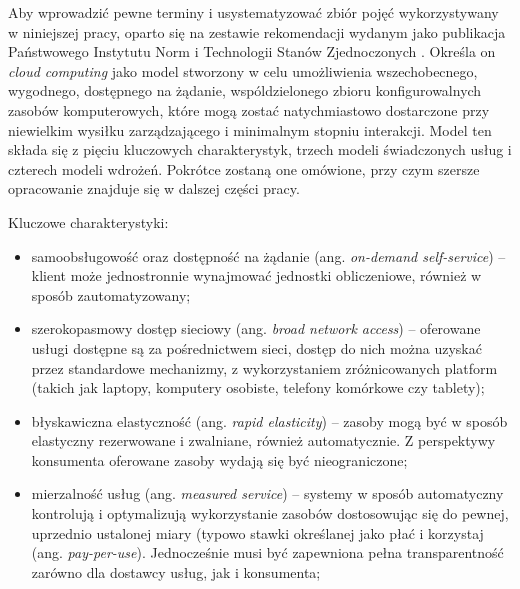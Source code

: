\documentclass[12pt,a4paper,twoside]{article}
\begin{document}
Aby wprowadzić pewne terminy i usystematyzować zbiór pojęć wykorzystywany w niniejszej pracy, oparto się na zestawie rekomendacji wydanym jako publikacja Państwowego Instytutu Norm i Technologii Stanów Zjednoczonych \citep{mell2011}. Określa on \textit{cloud computing} jako model stworzony w celu umożliwienia wszechobecnego, wygodnego, dostępnego na żądanie, wspóldzielonego zbioru konfigurowalnych zasobów komputerowych, które mogą zostać natychmiastowo dostarczone przy niewielkim wysiłku zarządzającego i minimalnym stopniu interakcji. Model ten składa się z pięciu kluczowych charakterystyk, trzech modeli świadczonych usług i czterech modeli wdrożeń. Pokrótce zostaną one omówione, przy czym szersze opracowanie znajduje się w dalszej części pracy.

\noindent
Kluczowe charakterystyki:
\begin{itemize}
\item samoobsługowość oraz dostępność na żądanie (ang. \textit{on-demand self-service}) -- klient może jednostronnie wynajmować jednostki obliczeniowe, również w sposób zautomatyzowany;
\item szerokopasmowy dostęp sieciowy (ang. \textit{broad network access}) -- oferowane usługi dostępne są za pośrednictwem sieci, dostęp do nich można uzyskać przez standardowe mechanizmy, z wykorzystaniem zróżnicowanych platform (takich jak laptopy, komputery osobiste, telefony komórkowe czy tablety);
\item błyskawiczna elastyczność (ang. \textit{rapid elasticity}) -- zasoby mogą być w sposób elastyczny rezerwowane i zwalniane, również automatycznie. Z perspektywy konsumenta oferowane zasoby wydają się być nieograniczone;
\item mierzalność usług (ang. \textit{measured service}) -- systemy w sposób automatyczny kontrolują i optymalizują wykorzystanie zasobów dostosowując się do pewnej, uprzednio ustalonej miary (typowo stawki określanej jako płać i korzystaj (ang. \textit{pay-per-use}). Jednocześnie musi być zapewniona pełna transparentność zarówno dla dostawcy usług, jak i konsumenta;
\end{itemize}
\end{document}
